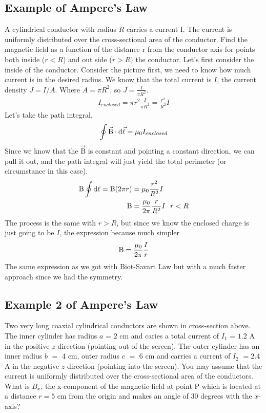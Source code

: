 \subsection{Example of Ampere's Law}
A cylindrical conductor with radius $R$ carries a current I.
The current is uniformly distributed over the cross-sectional area of
the conductor. Find the magnetic field as a function of the distance r
from the conductor axis for points both inside ($r < R$) and out side ($r > R)$ the conductor. 
Let's first consider the inside of the conductor. Consider the picture first, we need to know how much current is in the desired radius. We know that the total current is $I$, the current density $J=I/A$. Where $A = \pi R^2 $, so $J=\frac{I}{\pi R^2}$. 
\begin{align*}
	I_{enclosed} = \pi r^2 \frac{I}{\pi R^2} = \frac{r^2}{R^2}I
\end{align*}
Let's take the path integral, 
\begin{equation*}
	\oint \vec{\mathrm{B}} \cdot \mathrm{d}\vec{\mathrm{\ell}} = \mu_0I_{enclosed}
\end{equation*}
Since we know that the $\vec{\mathrm{B}}$ is constant and pointing a constant direction, we can pull it out, and the path integral will just yield the total perimeter (or circumstance in this case). 
\begin{align*}
	\mathrm{B} \oint \mathrm{d\ell} = \mathrm{B} (2\pi r) &= \mu_0\frac{r^2}{R^2}I \\ 
	\mathrm{B} &= \frac{\mu_0}{2\pi}\frac{r}{R^2}I  \:\:\: r < R
\end{align*}
The process is the same with $r > R$, but since we know the enclosed charge is just going to be $I$, the expression because much simpler
\begin{equation*}
	\mathrm{B} = \frac{\mu_0}{2\pi}\frac{I}{r}
\end{equation*}
The same expression as we got with Biot-Savart Law but with a much faster approach since we had the symmetry.
\subsection{Example 2 of Ampere's Law} 
Two very long coaxial cylindrical conductors are shown in cross-section above. The inner cylinder has radius $a$ = $2$ cm and caries a total current of $I_1$ = $1.2$ A in the positive $z$-direction (pointing out of the screen). The outer cylinder has an inner radius $b$ $=$ $4$ cm, outer radius $c$ $=$ $6$ cm and carries a current of $I_2$ $= 2.4$ A in the negative $z$-direction (pointing into the screen). You may assume that the current is uniformly distributed over the cross-sectional area of the conductors. What is $B_x$, the x-component of the magnetic field at point P which is located at a distance $r = 5$ cm from the origin and makes an angle of $30$ degrees with the $x$-axis? 

